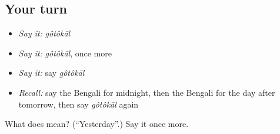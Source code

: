 \subsection*{Your turn}
\begin{itemize}
\raggedright
  \item \emph{Say it:} \emph{gôtôkāl}
  \item \emph{Say it:} \emph{gôtôkāl}, once more
  \item \emph{Say it:} say \emph{gôtôkāl}
  \item \emph{Recall:} say the Bengali for midnight, then the Bengali for the day after tomorrow, then say \emph{gôtôkāl} again
\end{itemize}

\begin{tcolorbox}[breakable,colback=teal!4,colframe=teal!35!black,title={Before you move on}]
What does  mean? (\textquotedblleft{}Yesterday\textquotedblright{}.) Say it once more.
\end{tcolorbox}
